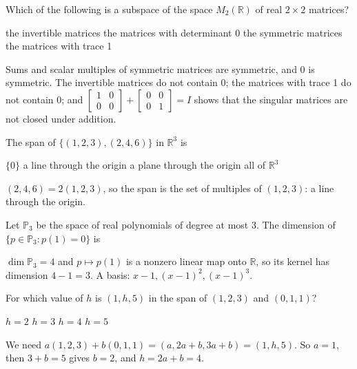 \begin{question}[id=vs-2]
Which of the following is a subspace of the space $M_2(\mathbb{R})$ of real $2 \times 2$ matrices?
\begin{options}
  \option the invertible matrices
  \option the matrices with determinant 0
  \correct the symmetric matrices
  \option the matrices with trace 1
\end{options}
\begin{solution}
Sums and scalar multiples of symmetric matrices are symmetric, and 0 is symmetric. The invertible matrices do not contain 0; the matrices with trace 1 do not contain 0; and $\begin{bmatrix} 1 & 0 \\ 0 & 0 \end{bmatrix} + \begin{bmatrix} 0 & 0 \\ 0 & 1 \end{bmatrix} = I$ shows that the singular matrices are not closed under addition.
\end{solution}
\end{question}

\begin{question}[id=vs-3]
The span of $\{(1, 2, 3), (2, 4, 6)\}$ in $\mathbb{R}^3$ is
\begin{options}
  \option $\{0\}$
  \correct a line through the origin
  \option a plane through the origin
  \option all of $\mathbb{R}^3$
\end{options}
\begin{solution}
$(2, 4, 6) = 2(1, 2, 3)$, so the span is the set of multiples of $(1, 2, 3)$: a line through the origin.
\end{solution}
\end{question}

\begin{question}[id=vs-4]
Let $\mathbb{P}_3$ be the space of real polynomials of degree at most 3. The dimension of $\{p \in \mathbb{P}_3 : p(1) = 0\}$ is
\begin{solution}
$\dim \mathbb{P}_3 = 4$ and $p \mapsto p(1)$ is a nonzero linear map onto $\mathbb{R}$, so its kernel has dimension $4 - 1 = 3$. A basis: $x - 1, (x - 1)^2, (x - 1)^3$.
\end{solution}
\end{question}

\begin{question}[id=vs-5, marks=2]
For which value of $h$ is $(1, h, 5)$ in the span of $(1, 2, 3)$ and $(0, 1, 1)$?
\begin{options}
  \option $h = 2$
  \option $h = 3$
  \correct $h = 4$
  \option $h = 5$
\end{options}
\begin{solution}
We need $a(1, 2, 3) + b(0, 1, 1) = (a, 2a + b, 3a + b) = (1, h, 5)$. So $a = 1$, then $3 + b = 5$ gives $b = 2$, and $h = 2a + b = 4$.
\end{solution}
\end{question}

